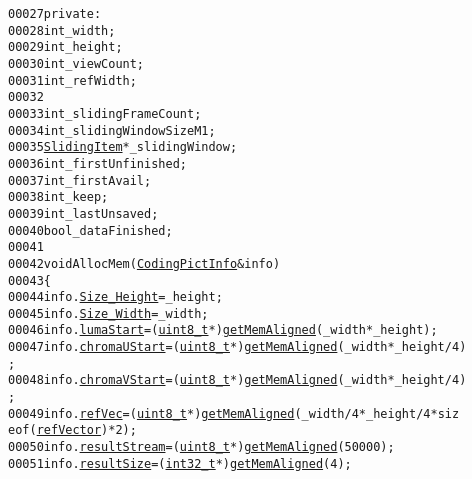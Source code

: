 \begin{footnotesize}
\begin{alltt}
00027 \textcolor{keyword}{private}:
00028         \textcolor{keywordtype}{int} \_width;
00029         \textcolor{keywordtype}{int} \_height;
00030         \textcolor{keywordtype}{int} \_viewCount;
00031         \textcolor{keywordtype}{int} \_refWidth;
00032 
00033         \textcolor{keywordtype}{int} \_slidingFrameCount;
00034         \textcolor{keywordtype}{int} \_slidingWindowSizeM1;
00035         \hyperlink{structtag_sliding_item}{SlidingItem} *\_slidingWindow;
00036         \textcolor{keywordtype}{int} \_firstUnfinished;
00037         \textcolor{keywordtype}{int} \_firstAvail;
00038         \textcolor{keywordtype}{int} \_keep;
00039         \textcolor{keywordtype}{int} \_lastUnsaved;
00040         \textcolor{keywordtype}{bool} \_dataFinished;
00041 
00042         \textcolor{keywordtype}{void} AllocMem(\hyperlink{struct_coding_pict_info}{CodingPictInfo} &info)
00043         \{
00044                 info.\hyperlink{struct_coding_pict_info_aa6352dc53234c55d1a0c252c5b8d6141}{Size_Height} = \_height;
00045                 info.\hyperlink{struct_coding_pict_info_afeeb373571d44e64d473524e6127f3f7}{Size_Width} = \_width;
00046                 info.\hyperlink{struct_coding_pict_info_a62aee8cc8c9cac725d4f44a19ddc8c2b}{lumaStart} = (\hyperlink{_types_8h_a363e4d606232036a6b89060813c45489}{uint8_t}*)\hyperlink{_arch_8h_a82f8f71a4da739209ebbe575faa842e9}{getMemAligned}(\_width * \_height);
00047                 info.\hyperlink{struct_coding_pict_info_a103a3180ba57db0bd984a53f0668b70b}{chromaUStart} = (\hyperlink{_types_8h_a363e4d606232036a6b89060813c45489}{uint8_t}*)\hyperlink{_arch_8h_a82f8f71a4da739209ebbe575faa842e9}{getMemAligned}(\_width * \_height / 4)
      ;
00048                 info.\hyperlink{struct_coding_pict_info_a7be3395b2a1e7f4b384421c2490dcfdc}{chromaVStart} = (\hyperlink{_types_8h_a363e4d606232036a6b89060813c45489}{uint8_t}*)\hyperlink{_arch_8h_a82f8f71a4da739209ebbe575faa842e9}{getMemAligned}(\_width * \_height / 4)
      ;
00049                 info.\hyperlink{struct_coding_pict_info_aa49520dd613a44185d6a41af8992d66c}{refVec} = (\hyperlink{_types_8h_a363e4d606232036a6b89060813c45489}{uint8_t} *)\hyperlink{_arch_8h_a82f8f71a4da739209ebbe575faa842e9}{getMemAligned}(\_width/4 * \_height/4 * \textcolor{keyword}{siz
      eof}(\hyperlink{structref_vector}{refVector}) * 2);
00050                 info.\hyperlink{struct_coding_pict_info_af53de7a35b8796df845ddee01d70fc5b}{resultStream} = (\hyperlink{_types_8h_a363e4d606232036a6b89060813c45489}{uint8_t}*)\hyperlink{_arch_8h_a82f8f71a4da739209ebbe575faa842e9}{getMemAligned}(50000);
00051                 info.\hyperlink{struct_coding_pict_info_a37155b7c53db0a4a94d314bdc3c95104}{resultSize} = (\hyperlink{_types_8h_a115ba3a1b24a8702355c5dbd61ce01e0}{int32_t}*)\hyperlink{_arch_8h_a82f8f71a4da739209ebbe575faa842e9}{getMemAligned}(4);

\end{alltt}
\end{footnotesize}
